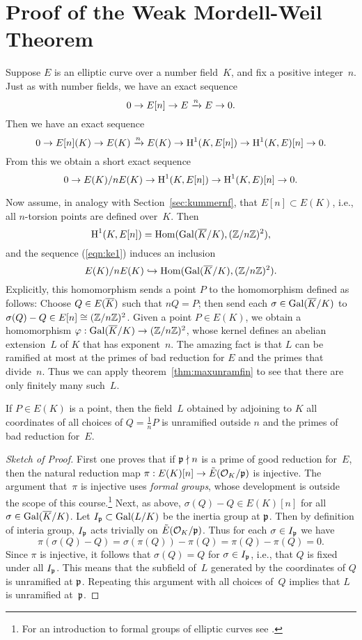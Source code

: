 \section{Proof of the Weak Mordell-Weil Theorem}
Suppose $E$ is an elliptic curve over a number field~$K$, and
fix a positive integer~$n$.
Just as with number fields, we have an exact sequence
$$
	0 \to E[n] \to E \xrightarrow{n} E \to 0.
$$
Then we have an exact sequence
$$
	0 \to E[n](K) \to E(K) \xrightarrow{n} E(K) \to \operatorname{H}^1(K,E[n]) \to \operatorname{H}^1(K,E)[n] \to 0.
$$
From this we obtain a short exact sequence
\begin{equation}\label{eqn:ke1}
	0 \to E(K)/n E(K) \to \operatorname{H}^1(K,E[n]) \to \operatorname{H}^1(K,E)[n] \to 0.
\end{equation}

Now assume, in analogy with Section~\ref{sec:kummernf}, that
$E[n]\subset E(K)$, i.e., all $n$-torsion points are defined over~$K$.
Then
$$
	\operatorname{H}^1(K,E[n]) = \operatorname{Hom}(\operatorname{Gal}(\overline{K}/K),(\mathbb{Z}/n\mathbb{Z})^2),
$$
and the sequence (\ref{eqn:ke1}) induces an inclusion
\begin{equation}\label{eqn:injmw}
	E(K)/n E(K) \hookrightarrow \operatorname{Hom}(\operatorname{Gal}(\overline{K}/K),(\mathbb{Z}/n\mathbb{Z})^2).
\end{equation}
Explicitly, this homomorphism sends a point $P$ to the homomorphism
defined as follows: Choose $Q \in E(\overline{K})$ such that $nQ = P$; then
send each $\sigma \in \operatorname{Gal}(\overline{K}/K)$ to $\sigma(Q)-Q\in E[n]\cong
(\mathbb{Z}/n\mathbb{Z})^2$.  Given a point $P\in E(K)$, we obtain a homomorphism
$\varphi : \operatorname{Gal}(\overline{K}/K) \to (\mathbb{Z}/n\mathbb{Z})^2$, whose kernel defines an
abelian extension~$L$ of $K$ that has exponent~$n$.
The amazing fact is that $L$ can be ramified at most at the primes
of bad reduction for $E$ and the primes that divide~$n$.
Thus we can apply theorem~\ref{thm:maxunramfin} to see that there are
only finitely many such~$L$.

\begin{theorem}\label{thm:mwunram}
	If $P\in E(K)$ is a point, then the field~$L$ obtained by adjoining to $K$
	all coordinates of all choices of $Q=\frac{1}{n}P$ is unramified
	outside $n$ and the primes of bad reduction for~$E$.
\end{theorem}
\begin{proof}[Sketch of Proof]
	First one proves that if $\mathfrak{p} \nmid n$ is a prime of good reduction
	for~$E$, then the natural reduction map $\pi: E(K)[n] \to
	\tilde{E}(\mathcal{O}_K/\mathfrak{p})$ is injective.  The argument that~$\pi$ is
	injective uses \emph{formal groups}, whose development is outside the
	scope of this course.\footnote{For an introduction to
	formal groups of elliptic curves see \cite[Ch. IV]{silverman:aec}.}
	Next, as above, $\sigma(Q)-Q \in E(K)[n]$ for
	all $\sigma \in \operatorname{Gal}(\overline{K}/K)$.  Let $I_{\mathfrak{p}}\subset \operatorname{Gal}(L/K)$ be the
	inertia group at $\mathfrak{p}$.  Then by definition of interia group, $I_{\mathfrak{p}}$
	acts trivially on $\tilde{E}(\mathcal{O}_K/\mathfrak{p})$.  Thus for each $\sigma \in
	I_{\mathfrak{p}}$ we have
	$$
		\pi(\sigma(Q) - Q) = \sigma(\pi(Q)) - \pi(Q) = \pi(Q) - \pi(Q) = 0.
	$$
	Since $\pi$ is injective, it follows that $\sigma(Q) = Q$ for $\sigma\in I_{\mathfrak{p}}$,
	i.e., that $Q$ is fixed under all $I_{\mathfrak{p}}$.  This means that the subfield
	of~$L$ generated by the coordinates of $Q$ is unramified at $\mathfrak{p}$.
	Repeating this argument with all choices of~$Q$ implies that $L$
	is unramified at~$\mathfrak{p}$.
\end{proof}


